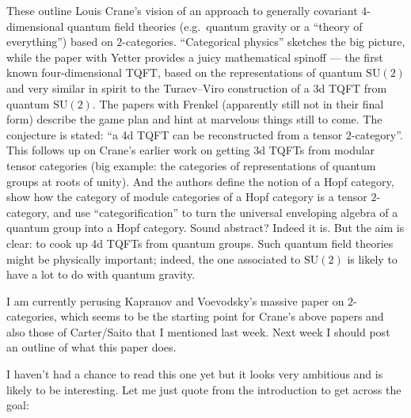 \documentclass[12pt]{article}
\def\tightlist{}
\renewcommand{\texttt}[1]{%
  \begingroup
  \ttfamily
  \begingroup\lccode`~=`/\lowercase{\endgroup\def~}{/\discretionary{}{}{}}%
  \begingroup\lccode`~=`[\lowercase{\endgroup\def~}{[\discretionary{}{}{}}%
  \begingroup\lccode`~=`.\lowercase{\endgroup\def~}{.\discretionary{}{}{}}%
  \catcode`/=\active\catcode`[=\active\catcode`.=\active
  \scantokens{#1\noexpand}%
  \endgroup
}
\begin{document}
These outline Louis Crane's vision of an approach to generally covariant
\(4\)-dimensional quantum field theories (e.g.~quantum gravity or a
``theory of everything'') based on \(2\)-categories. ``Categorical
physics'' sketches the big picture, while the paper with Yetter provides
a juicy mathematical spinoff --- the first known four-dimensional TQFT,
based on the representations of quantum \(\mathrm{SU}(2)\) and very
similar in spirit to the Turaev--Viro construction of a 3d TQFT from
quantum \(\mathrm{SU}(2)\). The papers with Frenkel (apparently still
not in their final form) describe the game plan and hint at marvelous
things still to come. The conjecture is stated: ``a 4d TQFT can be
reconstructed from a tensor \(2\)-category''. This follows up on Crane's
earlier work on getting 3d TQFTs from modular tensor categories (big
example: the categories of representations of quantum groups at roots of
unity). And the authors define the notion of a Hopf category, show how
the category of module categories of a Hopf category is a tensor
\(2\)-category, and use ``categorification'' to turn the universal
enveloping algebra of a quantum group into a Hopf category. Sound
abstract? Indeed it is. But the aim is clear: to cook up 4d TQFTs from
quantum groups. Such quantum field theories might be physically
important; indeed, the one associated to \(\mathrm{SU}(2)\) is likely to
have a lot to do with quantum gravity.

I am currently perusing Kapranov and Voevodsky's massive paper on
\(2\)-categories, which seems to be the starting point for Crane's above
papers and also those of Carter/Saito that I mentioned last week. Next
week I should post an outline of what this paper does.

\noindent
I haven't had a chance to read this one yet but it looks very ambitious
and is likely to be interesting. Let me just quote from the introduction
to get across the goal:
\end{document}
